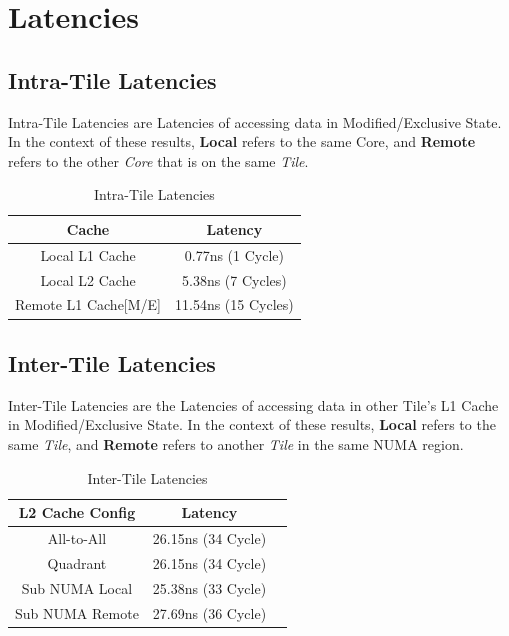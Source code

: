 \documentclass[bsc,frontabs,twoside,singlespacing,parskip,deptreport]{infthesis}     %
\begin{document}
\section{Latencies}

\subsection{Intra-Tile Latencies}
Intra-Tile Latencies are Latencies of accessing data in Modified/Exclusive State. In the context of these results, \textbf{Local} refers to the same Core, and \textbf{Remote} refers to the other \emph{Core} that is on the same \emph{Tile}.
\begin{table}[!h]
\begin{center}
\caption{Intra-Tile Latencies}
\label{fig:intra-tile-latencies}
\begin{tabular}{ |c|c| } 
    \hline
    Cache & Latency \\
    \hline
    Local L1 Cache & 0.77ns (1 Cycle) \\
    Local L2 Cache & 5.38ns (7 Cycles) \\
    Remote L1 Cache[M/E] & 11.54ns (15 Cycles) \\
    \hline
\end{tabular}
\end{center}
\end{table}

\subsection{Inter-Tile Latencies}
 Inter-Tile Latencies are the Latencies of accessing data in other Tile's L1 Cache in Modified/Exclusive State. In the context of these results, \textbf{Local} refers to the same \emph{Tile}, and \textbf{Remote} refers to another \emph{Tile} in the same NUMA region.
\begin{table}[!h]
\begin{center}
\caption{Inter-Tile Latencies}
\label{fig:inter-tile-latencies}
\begin{tabular}{ |c|c|c| } 
    \hline
    L2 Cache Config & Latency \\
    \hline
    All-to-All & 26.15ns (34 Cycle) \\
    Quadrant & 26.15ns (34 Cycle) \\
    Sub NUMA Local & 25.38ns (33 Cycle) \\
    Sub NUMA Remote & 27.69ns (36 Cycle) \\
    \hline
\end{tabular}
\end{center}
\end{table}
\end{document}
